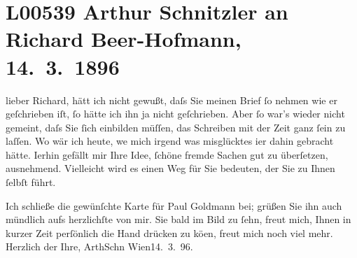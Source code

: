 

\section[Arthur Schnitzler an Richard Beer-Hofmann, 14. 3. 1896]{L00539 Arthur Schnitzler an Richard Beer-Hofmann, 14. 3. 1896}
\nopagebreak{}
\rehead{ }\normalsize\beginnumbering{}
\toendnotes[C]{\smallbreak\pagebreak[2]}
\pstart
           \noindent{}{\pb}lieber Richard, hätt ich nicht gewußt, daſs Sie meinen Brief ſo
               nehmen wie er geſchrieben iſt, ſo hätte ich ihn ja nicht geſchrieben. Aber ſo war’s
               wieder nicht gemeint, daſs Sie ſich einbilden \introOben{}müſſen\introOben{}, das
               Schreiben mit der Zeit ganz ſein zu laſſen. Wo wär ich heute, we{\geminationn} mich irgend was misglücktes i{\geminationm}er dahin gebracht hätte. I{\geminationm}erhin gefällt mir Ihre Idee, ſchöne fremde Sachen gut zu überſetzen, ausnehmend.
               Vielleicht wird es einen Weg für Sie bedeuten, der Sie zu Ihnen ſelbſt führt.\pend
           
\pstart
           {\pb}Ich schließe die gewünſchte Karte für Paul Goldmann bei; grüßen Sie ihn auch mündlich
               aufs herzlichſte von mir. Sie bald im Bild zu ſehn, freut mich, Ihnen in kurzer Zeit
               perſönlich die Hand drücken zu kö{\geminationn}en, freut mich noch
               viel mehr.\pend
           \pstart Herzlich der Ihre, \spacefill\mbox{ArthSchn}\pend{}
\pstart
           Wien14. 3. 96.\pend
           \endnumbering{}  
      